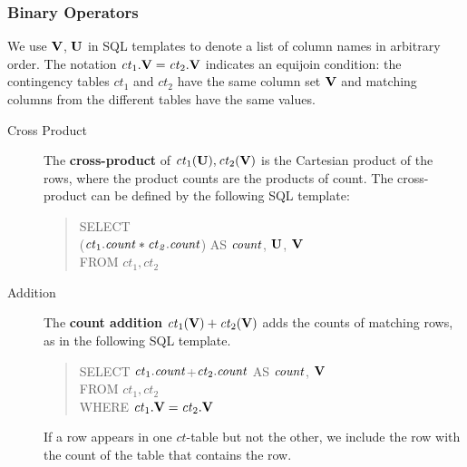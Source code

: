 \documentclass{sig-alternate-2013}
\newcommand{\ct}{\mathit{ct}}
\begin{document}
\subsubsection{Binary Operators} \label{sec:bin}
We use $\mathbf{V}$, $\mathbf{U}$ in SQL templates to denote a list of column names in arbitrary order. The notation $\ct_{1}.\set{V} = \ct_{2}.\set{V}$ indicates an equijoin condition: the contingency tables $\ct_{1}$ and $\ct_{2}$ have the same column set $\mathbf{V}$ and matching columns from the different tables have the same values.
\begin{description}
\item[Cross Product]  %
The \textbf{cross-product} of $\ct_{1}(\set{U}),\ct_{2}(\set{V})$ is the Cartesian product of the rows, where the product counts are the products of count. The cross-product can be defined by the following SQL template:
\begin{quote}
SELECT \\($\ct_{1}.\qcount *\ct_{2}.\qcount$) AS $\it{count}$,  $\mathbf{U}$, $\mathbf{V}$\\
FROM  $\ct_{1},\ct_{2}$
\end{quote}


\item[Addition] 
 The \textbf{count addition} $\ct_{1}(\set{V}) + \ct_{2}(\set{V})$ adds the counts of matching rows, as in the following SQL template.
\begin{quote}
SELECT %
$\ct_{1}.\qcount$+$\ct_{2}.\qcount$ AS $\it{count}$, $\mathbf{V}$ \\%
FROM  $\ct_{1},\ct_{2}$\\
WHERE $\ct_{1}.\set{V} = \ct_{2}.\set{V}$
\end{quote}

If a row appears in one $\ct$-table but not the other, we include the row with the count of the table that contains the row. %


\end{description}
\end{document}
